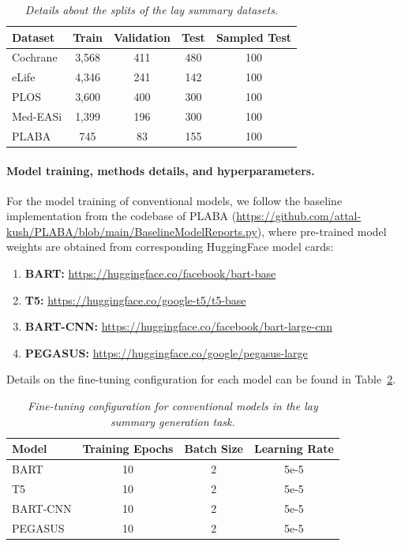 \documentclass{article}
\begin{document}
\begin{table}[!ht]
\centering
\footnotesize
\caption{\textit{Details about the splits of the lay summary datasets.}}
\label{tab:datasets_split_laysummary}
\begin{tabular}{lcccc}
\toprule
\textbf{Dataset}       & \textbf{Train}  & \textbf{Validation} & \textbf{Test} & \textbf{Sampled Test} \\
\midrule
Cochrane      & 3,568  & 411        & 480 & 100  \\
eLife         & 4,346  & 241        & 142 & 100  \\
PLOS          & 3,600  & 400          & 300 & 100  \\
Med-EASi      & 1,399  & 196        & 300 & 100  \\
PLABA         & 745 & 83      & 155 & 100  \\
\bottomrule
\end{tabular}
\end{table}


\paragraph{Model training, methods details, and hyperparameters.}
\label{sec:app_task2_models_hyperparams}
For the model training of conventional models, we follow the baseline implementation from the codebase of PLABA (\url{https://github.com/attal-kush/PLABA/blob/main/BaselineModelReports.py}), where pre-trained model weights are obtained from corresponding HuggingFace model cards:
\begin{enumerate}
    \item\textbf{BART:} \url{https://huggingface.co/facebook/bart-base}
    \item\textbf{T5:} \url{https://huggingface.co/google-t5/t5-base}
    \item\textbf{BART-CNN:} \url{https://huggingface.co/facebook/bart-large-cnn}
    \item\textbf{PEGASUS:} \url{https://huggingface.co/google/pegasus-large}
\end{enumerate}
Details on the fine-tuning configuration for each model can be found in Table~\ref{tab:finetuning_configurations_laysummary}.

\begin{table}[!ht]
\centering
\footnotesize
\caption{\textit{Fine-tuning configuration for conventional models in the lay summary generation task.}}
\label{tab:finetuning_configurations_laysummary}
\begin{tabular}{lccc}
\toprule
\textbf{Model}          & \textbf{Training Epochs} & \textbf{Batch Size} & \textbf{Learning Rate} \\ \midrule
BART      & 10             & 2          & 5e-5          \\
T5        & 10             & 2          & 5e-5          \\
BART-CNN & 10             & 2          & 5e-5          \\
PEGASUS  & 10             & 2          & 5e-5    \\ \bottomrule     
\end{tabular}
\end{table}
\end{document}
